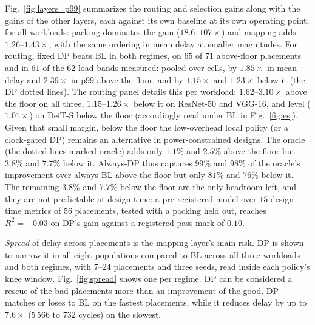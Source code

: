 Fig.~\ref{fig:layers_p99} summarizes the routing and selection gains along
with the gains of the other layers, each against its own baseline at its own
operating point, for all workloads: packing dominates the gain
($18.6$--$107\times$) and mapping adds $1.26$--$1.43\times$, with the same
ordering in mean delay at smaller magnitudes. For routing, fixed DP beats BL
in both regimes, on $65$ of $71$ above-floor placements and in $61$ of the
$62$ load bands measured: pooled over cells, by $1.85\times$ in mean delay and
$2.39\times$ in p99 above the floor, and by $1.15\times$ and $1.23\times$
below it (the DP dotted lines). The routing panel details this per workload:
$1.62$--$3.10\times$ above the floor on all three, $1.15$--$1.26\times$ below
it on ResNet-50 and VGG-16, and level ($1.01\times$) on DeiT-S below the floor
(accordingly read under BL in Fig.~\ref{fig:es}). Given that small margin,
below the floor the low-overhead local policy (or a clock-gated DP) remains an
alternative in power-constrained designs. The oracle (the dotted lines marked
oracle) adds only $1.1\%$ and $2.5\%$ above the floor but $3.8\%$ and $7.7\%$
below it. Always-DP thus captures $99\%$ and $98\%$ of the oracle's
improvement over always-BL above the floor but only $81\%$ and $76\%$ below
it. The remaining $3.8\%$ and $7.7\%$ below the floor are the only headroom left,
and they are not predictable at design time: a pre-registered model over $15$
design-time metrics of $56$ placements, tested with a packing held out,
reaches $R^2 = -0.03$ on DP's gain against a registered pass mark of $0.10$.

\emph{Spread} of delay across placements is the
mapping layer's main risk. DP is shown to narrow it in all eight populations
compared to BL across all three workloads and both regimes, with $7$--$24$
placements and three seeds, read inside each policy's knee window. Fig.~\ref{fig:spread} shows one per regime.
DP can be considered a rescue of the bad placements more than an improvement of
the good. DP matches or loses
to BL on the fastest placements, while it reduces delay by up to $7.6\times$ ($5\,566$ to
$732$ cycles) on the slowest.